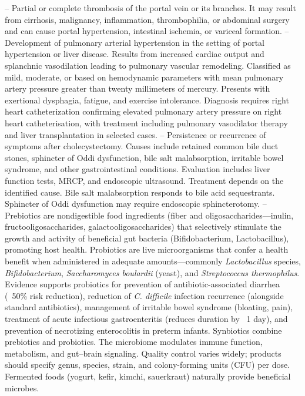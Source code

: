 -- Partial or complete thrombosis of the portal vein or its branches. It may result from cirrhosis, malignancy, inflammation, thrombophilia, or abdominal surgery and can cause portal hypertension, intestinal ischemia, or variceal formation.
-- Development of pulmonary arterial hypertension in the setting of portal hypertension or liver disease. Results from increased cardiac output and splanchnic vasodilation leading to pulmonary vascular remodeling. Classified as mild, moderate, or based on hemodynamic parameters with mean pulmonary artery pressure greater than twenty millimeters of mercury. Presents with exertional dysphagia, fatigue, and exercise intolerance. Diagnosis requires right heart catheterization confirming elevated pulmonary artery pressure on right heart catheterisation, with treatment including pulmonary vasodilator therapy and liver transplantation in selected cases.
-- Persistence or recurrence of symptoms after cholecystectomy. Causes include retained common bile duct stones, sphincter of Oddi dysfunction, bile salt malabsorption, irritable bowel syndrome, and other gastrointestinal conditions. Evaluation includes liver function tests, MRCP, and endoscopic ultrasound. Treatment depends on the identified cause. Bile salt malabsorption responds to bile acid sequestrants. Sphincter of Oddi dysfunction may require endoscopic sphincterotomy.
-- Prebiotics are nondigestible food ingredients (fiber and oligosaccharides—inulin, fructooligosaccharides, galactooligosaccharides) that selectively stimulate the growth and activity of beneficial gut bacteria (Bifidobacterium, Lactobacillus), promoting host health. Probiotics are live microorganisms that confer a health benefit when administered in adequate amounts—commonly \emph{Lactobacillus} species, \emph{Bifidobacterium}, \emph{Saccharomyces boulardii} (yeast), and \emph{Streptococcus thermophilus}. Evidence supports probiotics for prevention of antibiotic-associated diarrhea (~50\% risk reduction), reduction of \emph{C. difficile} infection recurrence (alongside standard antibiotics), management of irritable bowel syndrome (bloating, pain), treatment of acute infectious gastroenteritis (reduces duration by ~1 day), and prevention of necrotizing enterocolitis in preterm infants. Synbiotics combine prebiotics and probiotics. The microbiome modulates immune function, metabolism, and gut--brain signaling. Quality control varies widely; products should specify genus, species, strain, and colony-forming units (CFU) per dose. Fermented foods (yogurt, kefir, kimchi, sauerkraut) naturally provide beneficial microbes.
